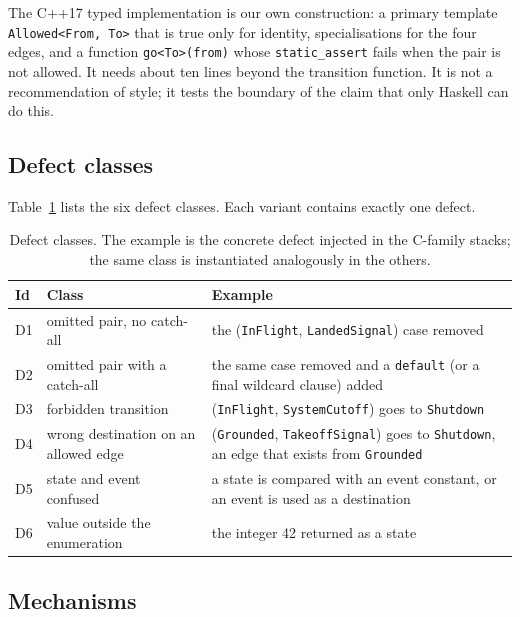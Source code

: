\documentclass[review,12pt]{elsarticle}
\newcommand{\code}[1]{\texttt{#1}}
\begin{document}
The C++17 typed implementation is our own construction: a primary template \code{Allowed<From, To>} that is true only for identity, specialisations for the four edges, and a function \code{go<To>(from)} whose \code{static\_assert} fails when the pair is not allowed. It needs about ten lines beyond the transition function. It is not a recommendation of style; it tests the boundary of the claim that only Haskell can do this.

\subsection{Defect classes}

Table~\ref{tab:classes} lists the six defect classes. Each variant contains exactly one defect.

\begin{table}[t]
\caption{Defect classes. The example is the concrete defect injected in the C-family stacks; the same class is instantiated analogously in the others.}
\label{tab:classes}
\centering
\footnotesize
\begin{tabular}{@{}lp{3.4cm}p{6.6cm}@{}}
\toprule
Id & Class & Example \\
\midrule
D1 & omitted pair, no catch-all & the (\code{InFlight}, \code{LandedSignal}) case removed \\
D2 & omitted pair with a catch-all & the same case removed and a \code{default} (or a final wildcard clause) added \\
D3 & forbidden transition & (\code{InFlight}, \code{SystemCutoff}) goes to \code{Shutdown} \\
D4 & wrong destination on an allowed edge & (\code{Grounded}, \code{TakeoffSignal}) goes to \code{Shutdown}, an edge that exists from \code{Grounded} \\
D5 & state and event confused & a state is compared with an event constant, or an event is used as a destination \\
D6 & value outside the enumeration & the integer 42 returned as a state \\
\bottomrule
\end{tabular}
\end{table}

\subsection{Mechanisms}
\end{document}
